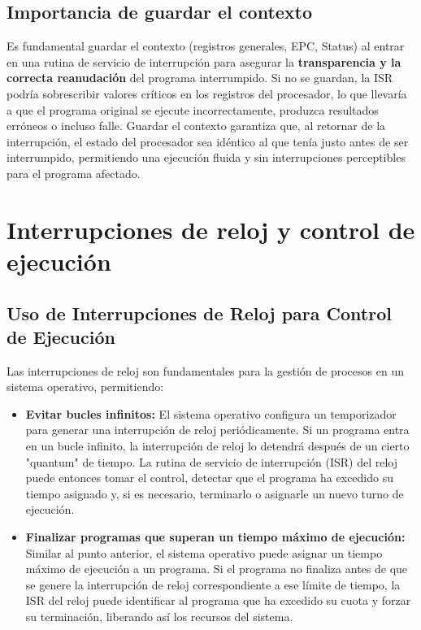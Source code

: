 \documentclass[12pt,a4paper]{article}
\begin{document}
	\subsection{Importancia de guardar el contexto}
	Es fundamental guardar el contexto (registros generales, EPC, Status) al entrar en una rutina de servicio de interrupción para asegurar la \textbf{transparencia y la correcta reanudación} del programa interrumpido. Si no se guardan, la ISR podría sobrescribir valores críticos en los registros del procesador, lo que llevaría a que el programa original se ejecute incorrectamente, produzca resultados erróneos o incluso falle. Guardar el contexto garantiza que, al retornar de la interrupción, el estado del procesador sea idéntico al que tenía justo antes de ser interrumpido, permitiendo una ejecución fluida y sin interrupciones perceptibles para el programa afectado.
	
	
	\section{Interrupciones de reloj y control de ejecución}
	
	\subsection{Uso de Interrupciones de Reloj para Control de Ejecución}
	Las interrupciones de reloj son fundamentales para la gestión de procesos en un sistema operativo, permitiendo:
	
	\begin{itemize}
		\item \textbf{Evitar bucles infinitos:} El sistema operativo configura un temporizador para generar una interrupción de reloj periódicamente. Si un programa entra en un bucle infinito, la interrupción de reloj lo detendrá después de un cierto "quantum" de tiempo. La rutina de servicio de interrupción (ISR) del reloj puede entonces tomar el control, detectar que el programa ha excedido su tiempo asignado y, si es necesario, terminarlo o asignarle un nuevo turno de ejecución.
		\item \textbf{Finalizar programas que superan un tiempo máximo de ejecución:} Similar al punto anterior, el sistema operativo puede asignar un tiempo máximo de ejecución a un programa. Si el programa no finaliza antes de que se genere la interrupción de reloj correspondiente a ese límite de tiempo, la ISR del reloj puede identificar al programa que ha excedido su cuota y forzar su terminación, liberando así los recursos del sistema.
	\end{itemize}
	
\end{document}
